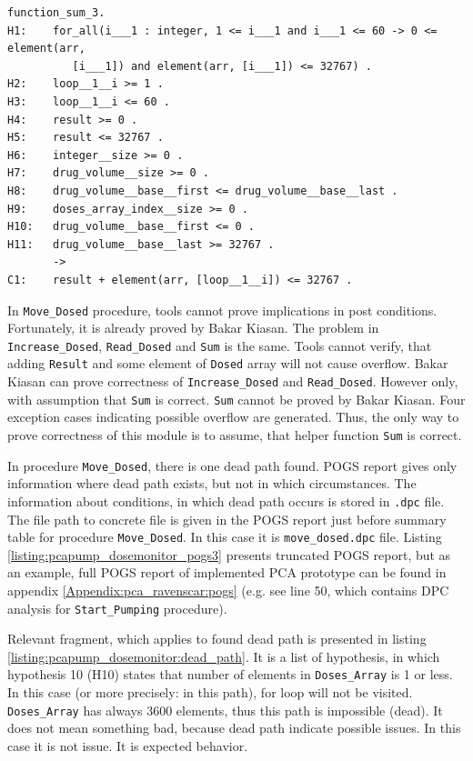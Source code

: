 \singlespacing
\begin{lstlisting}[frame=single, gobble=0, caption={Undischarged Verification Condition from sum.siv file}, label={listing:pcapump_undischarged_vc_sum}]
function_sum_3.
H1:    for_all(i___1 : integer, 1 <= i___1 and i___1 <= 60 -> 0 <= element(arr, 
          [i___1]) and element(arr, [i___1]) <= 32767) .
H2:    loop__1__i >= 1 .
H3:    loop__1__i <= 60 .
H4:    result >= 0 .
H5:    result <= 32767 .
H6:    integer__size >= 0 .
H7:    drug_volume__size >= 0 .
H8:    drug_volume__base__first <= drug_volume__base__last .
H9:    doses_array_index__size >= 0 .
H10:   drug_volume__base__first <= 0 .
H11:   drug_volume__base__last >= 32767 .
       ->
C1:    result + element(arr, [loop__1__i]) <= 32767 .
\end{lstlisting}
\doublespacing

In \lstinline{Move_Dosed} procedure, tools cannot prove implications in post conditions. Fortunately, it is already proved by Bakar Kiasan. The problem in \lstinline{Increase_Dosed}, \lstinline{Read_Dosed} and \lstinline{Sum} is the same. Tools cannot verify, that adding \lstinline{Result} and some element of \lstinline{Dosed} array will not cause overflow. Bakar Kiasan can prove correctness of \lstinline{Increase_Dosed} and \lstinline{Read_Dosed}. However only, with assumption that \lstinline{Sum} is correct. \lstinline{Sum} cannot be proved by Bakar Kiasan. Four exception cases indicating possible overflow are generated. Thus, the only way to prove correctness of this module is to assume, that helper function \lstinline{Sum} is correct.

In procedure \lstinline{Move_Dosed}, there is one dead path found. POGS report gives only information where dead path exists, but not in which circumstances. The information about conditions, in which dead path occurs is stored in \lstinline{.dpc} file. The file path to concrete file is given in the POGS report just before summary table for procedure \lstinline{Move_Dosed}. In this case it is \lstinline{move_dosed.dpc} file. Listing \ref{listing:pcapump_dosemonitor_pogs3} presents truncated POGS report, but as an example, full POGS report of implemented PCA prototype can be found in appendix \ref{Appendix:pca_ravenscar:pogs} (e.g. see line 50, which contains DPC analysis for \lstinline{Start_Pumping} procedure). 

Relevant fragment, which applies to found dead path is presented in listing \ref{listing:pcapump_dosemonitor:dead_path}. It is a list of hypothesis, in which hypothesis 10 (H10) states that number of elements in \lstinline{Doses_Array} is 1 or less. In this case (or more precisely: in this path), for loop will not be visited. \lstinline{Doses_Array} has always 3600 elements, thus this path is impossible (dead). It does not mean something bad, because dead path indicate possible issues. In this case it is not issue. It is expected behavior.

